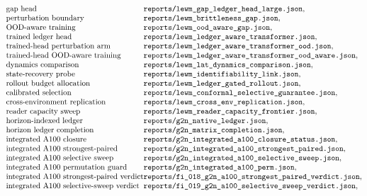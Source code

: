 $$
\begin{array}{@{}l@{}l@{}}
\text{gap head} & \texttt{reports/lewm\_gap\_ledger\_head\_large.json},\\
\text{perturbation boundary} & \texttt{reports/lewm\_brittleness\_gap.json},\\
\text{OOD-aware training} & \texttt{reports/lewm\_ood\_aware\_gap.json},\\
\text{trained ledger head} & \texttt{reports/lewm\_ledger\_aware\_transformer.json},\\
\text{trained-head perturbation arm} & \texttt{reports/lewm\_ledger\_aware\_transformer\_ood.json},\\
\text{trained-head OOD-aware training} & \texttt{reports/lewm\_ledger\_aware\_transformer\_ood\_aware.json},\\
\text{dynamics comparison} & \texttt{reports/lewm\_lat\_dynamics\_comparison.json},\\
\text{state-recovery probe} & \texttt{reports/lewm\_identifiability\_link.json},\\
\text{rollout budget allocation} & \texttt{reports/lewm\_ledger\_gated\_rollout.json},\\
\text{calibrated selection} & \texttt{reports/lewm\_conformal\_selective\_guarantee.json},\\
\text{cross-environment replication} & \texttt{reports/lewm\_cross\_env\_replication.json},\\
\text{reader capacity sweep} & \texttt{reports/lewm\_reader\_capacity\_frontier.json},\\
\text{horizon-indexed ledger} & \texttt{reports/g2n\_native\_ledger.json},\\
\text{horizon ledger completion} & \texttt{reports/g2n\_matrix\_completion.json},\\
\text{integrated A100 closure} & \texttt{reports/g2n\_integrated\_a100\_closure\_status.json},\\
\text{integrated A100 strongest-paired} & \texttt{reports/g2n\_integrated\_a100\_strongest\_paired.json},\\
\text{integrated A100 selective sweep} & \texttt{reports/g2n\_integrated\_a100\_selective\_sweep.json},\\
\text{integrated A100 permutation guard} & \texttt{reports/g2n\_integrated\_a100\_perm.json},\\
\text{integrated A100 strongest-paired verdict} & \texttt{reports/fi\_018\_g2n\_a100\_strongest\_paired\_verdict.json},\\
\text{integrated A100 selective-sweep verdict} & \texttt{reports/fi\_019\_g2n\_a100\_selective\_sweep\_verdict.json},\\

\end{array}$$
